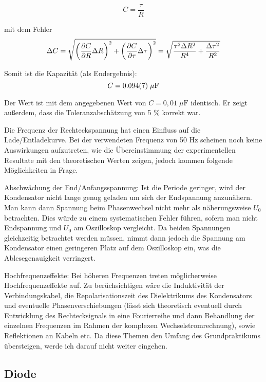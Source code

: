 \documentclass[a4paper,german,12pt,smallheadings]{scrartcl}
\begin{document}
\begin{equation}
  C = \frac{\tau}{R}
\end{equation}

mit dem Fehler
\begin{equation}
  \Delta C = \sqrt{
    \del{\frac{\partial C}{\partial R} \Delta R}^2 +
    \del{\frac{\partial C}{\partial \tau} \Delta \tau}^2
  }
  = \sqrt{
    \frac{\tau^2 \Delta R^2}{R^4} + \frac{\Delta \tau^2}{R^2}
  }
\end{equation}

Somit ist die Kapazität (als Endergebnis):
\begin{equation}
  C = \num{0.094+-0.007} \;\mu\text{F}
\end{equation}

Der Wert ist mit dem angegebenen Wert von $C = 0{,}01 \; \mu\text{F}$
identisch. Er zeigt außerdem, dass die Toleranzabschätzung von 5 \% korrekt
war.

Die Frequenz der Rechteckspannung hat einen Einfluss auf die
Lade/Entladekurve. Bei der verwendeten Frequenz von 50 Hz scheinen noch keine
Auswirkungen aufzutreten, wie die Übereinstimmung der experimentellen Resultate
mit den theoretischen Werten zeigen, jedoch kommen folgende Möglichkeiten in
Frage.

Abschwächung der End/Anfangsspannung: Ist die Periode geringer, wird der
Kondensator nicht lange genug geladen um sich der Endspannung anzunähern. Man
kann dann Spannung beim Phasenwechsel nicht mehr als näherungsweise $U_0$
betrachten. Dies würde zu einem systematischen Fehler führen, sofern man nicht
Endspannung und $U_0$ am Oszilloskop vergleicht. Da beiden Spannungen
gleichzeitig betrachtet werden müssen, nimmt dann jedoch die Spannung am
Kondensator einen geringeren Platz auf dem Oszilloskop ein, was die
Ablesegenauigkeit verringert.

Hochfrequenzeffekte: Bei höheren Frequenzen treten möglicherweise
Hochfrequenzeffekte auf. Zu berüchsichtigen wäre die Induktivität der
Verbindungskabel, die Repolarisationszeit des Dielektrikums des Kondensators
und eventuelle Phasenverschiebungen (lässt sich theoretisch eventuell durch
Entwicklung des Rechtecksignals in eine Fourierreihe und dann Behandlung der
einzelnen Frequenzen im Rahmen der komplexen Wechselstromrechnung), sowie
Reflektionen an Kabeln etc. Da diese Themen den Umfang des Grundpraktikums
übersteigen, werde ich darauf nicht weiter eingehen.

\subsection{Diode}
\end{document}
